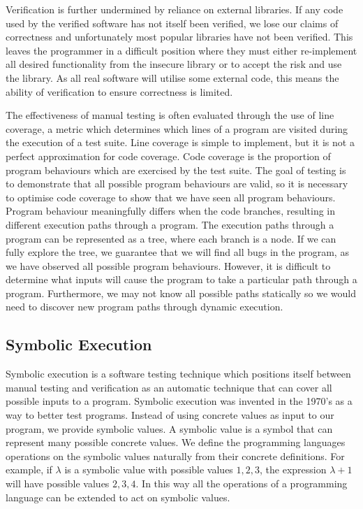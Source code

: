 \documentclass[12pt,twoside]{report}
\begin{document}
Verification is further undermined by reliance on external libraries. If any code used by the verified software has not itself been verified, we lose our claims of correctness and unfortunately most popular libraries have not been verified. This leaves the programmer in a difficult position where they must either re-implement all desired functionality from the insecure library or to accept the risk and use the library. As all real software will utilise some external code, this means the ability of verification to ensure correctness is limited.

The effectiveness of manual testing is often evaluated through the use of line coverage, a metric which determines which lines of a program are visited during the execution of a test suite. Line coverage is simple to implement, but it is not a perfect approximation for code coverage. Code coverage is the proportion of program behaviours which are exercised by the test suite. The goal of testing is to demonstrate that all possible program behaviours are valid, so it is necessary to optimise code coverage to show that we have seen all program behaviours. Program behaviour meaningfully differs when the code branches, resulting in different execution paths through a program. The execution paths through a program can be represented as a tree, where each branch is a node. If we can fully explore the tree, we guarantee that we will find all bugs in the program, as we have observed all possible program behaviours. However, it is difficult to determine what inputs will cause the program to take a particular path through a program. Furthermore, we may not know all possible paths statically so we would need to discover new program paths through dynamic execution.

\subsection{Symbolic Execution}
Symbolic execution is a software testing technique which positions itself between manual testing and verification as an automatic technique that can cover all possible inputs to a program. Symbolic execution was invented in the 1970's \cite{10.1145/800027.808444, 10.1145/360248.360252, 1702443, 10.1145/800027.808445} as a way to better test programs. Instead of using concrete values as input to our program, we provide symbolic values. A symbolic value is a symbol that can represent many possible concrete values. We define the programming languages operations on the symbolic values naturally from their concrete definitions. For example, if $\lambda$ is a symbolic value with possible values $1,2,3$, the expression $\lambda + 1$ will have possible values $2,3,4$. In this way all the operations of a programming language can be extended to act on symbolic values.
\end{document}
